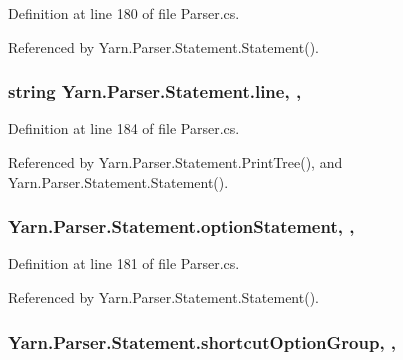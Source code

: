 Definition at line 180 of file Parser.\-cs.



Referenced by Yarn.\-Parser.\-Statement.\-Statement().

\hypertarget{a00168_a37695c7b00776bb292fd64894a70fb72}{
\subsubsection[{line}]{\setlength{\rightskip}{0pt plus 5cm}string Yarn.\-Parser.\-Statement.\-line\hspace{0.3cm}{\ttfamily [get]}, {\ttfamily [set]}, {\ttfamily [package]}}}\label{a00168_a37695c7b00776bb292fd64894a70fb72}


Definition at line 184 of file Parser.\-cs.



Referenced by Yarn.\-Parser.\-Statement.\-Print\-Tree(), and Yarn.\-Parser.\-Statement.\-Statement().

\hypertarget{a00168_a15020b7dab4983adbd185d5c2c2ebe84}{
\subsubsection[{option\-Statement}]{ Yarn.\-Parser.\-Statement.\-option\-Statement\hspace{0.3cm}{\ttfamily [get]}, {\ttfamily [set]}, {\ttfamily [package]}}}\label{a00168_a15020b7dab4983adbd185d5c2c2ebe84}


Definition at line 181 of file Parser.\-cs.



Referenced by Yarn.\-Parser.\-Statement.\-Statement().

\hypertarget{a00168_a54d73ad69c4af4a0d61edeaea4c8ca4f}{
\subsubsection[{shortcut\-Option\-Group}]{ Yarn.\-Parser.\-Statement.\-shortcut\-Option\-Group\hspace{0.3cm}{\ttfamily [get]}, {\ttfamily [set]}, {\ttfamily [package]}}}\label{a00168_a54d73ad69c4af4a0d61edeaea4c8ca4f}


